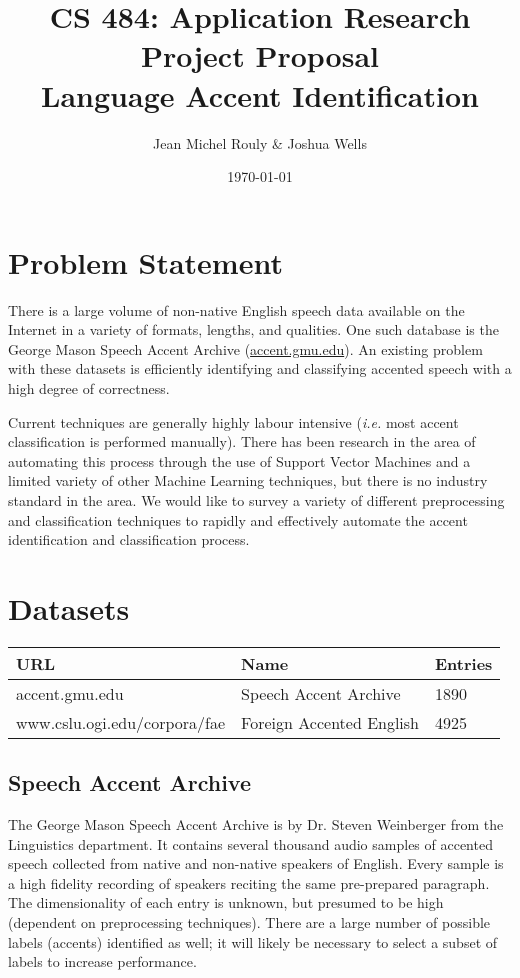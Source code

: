\documentclass[letterpaper,10pt]{article}
\title{
  \LARGE CS 484: Application Research Project Proposal \\
  \Huge Language Accent Identification \\
}
\author{Jean Michel Rouly \& Joshua Wells }
\date{\today}
\begin{document}
\maketitle

\section{Problem Statement}

There is a large volume of non-native English speech data available on the
Internet in a variety of formats, lengths, and qualities. One such database
is the George Mason Speech Accent Archive (\url{accent.gmu.edu}). An
existing problem with these datasets is efficiently identifying and
classifying accented speech with a high degree of correctness.

Current techniques are generally highly labour intensive (\textit{i.e.}
most accent classification is performed manually). There has been research
in the area of automating this process through the use of Support Vector
Machines and a limited variety of other Machine Learning techniques, but
there is no industry standard in the area. We would like to survey a
variety of different preprocessing and classification techniques to rapidly
and effectively automate the accent identification and classification
process.


\section{Datasets}

\begin{tabular}{lll}
\textbf{URL} & \textbf{Name} & \textbf{Entries} \\
\hline
accent.gmu.edu  & Speech Accent Archive & 1890 \\
www.cslu.ogi.edu/corpora/fae & Foreign Accented English & 4925 \\
\end{tabular}

\subsection{Speech Accent Archive}

The George Mason Speech Accent Archive is by Dr. Steven Weinberger from the
Linguistics department. It contains several thousand audio samples of
accented speech collected from native and non-native speakers of English.
Every sample is a high fidelity recording of speakers reciting the same
pre-prepared paragraph. The dimensionality of each entry is unknown, but
presumed to be high (dependent on preprocessing techniques). There are a
large number of possible labels (accents) identified as well; it will
likely be necessary to select a subset of labels to increase performance.
\end{document}
